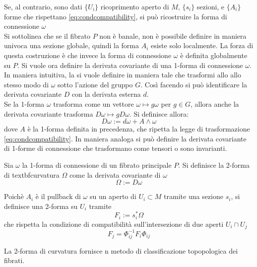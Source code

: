 Se, al contrario, sono dati $\{U_i\}$ ricoprimento aperto di $M$, $\{s_i\}$
sezioni, e $\{A_i\}$ forme che rispettano \ref{eq:condcompatibility}, si può
ricostruire la forma di connessione $\omega$\\
Si sottolinea che se il fibrato $P$ non è banale, non è possibile definire in
maniera univoca una sezione globale, quindi la forma $A_i$ esiste solo localmente.
La forza di questa costruzione è che invece la forma di connessione $\omega$
è definita globalmente su $P$.
Si vuole ora definire la derivata covariante di una
1-forma di connessione $\omega$.
In maniera intuitiva, la si vuole definire in maniera tale che trasformi allo
allo stesso modo di $\omega$ sotto l'azione del gruppo $G$. Così facendo si
può identificare la derivata covariante $D$ con la derivata esterna $d$.\\
Se la 1-forma $\omega$ trasforma come un vettore $\omega \mapsto g\omega$ per
$g \in G$, allora anche la derivata covariante trasforma $ D\omega \mapsto
g D\omega $. Si definisce allora:
   $$ D\omega := d\omega + A \wedge \omega $$
dove $A$ è la 1-forma definita in precedenza, che ripetta la legge di
trasformazione \ref{eq:condcompatibility}. In maniera analoga si può definire la
derivata covariante di 1-forme di connessione che trasformano come tensori o sono
invarianti.
\begin{definition}
   Sia $\omega$ la 1-forma di connessione di un fibrato principale $P$. Si definisce
   la 2-forma di textbf{curvatura} $\Omega$ come la derivata covariante di $\omega$
   $$ \Omega := D\omega $$
\end{definition}
Poichè $A_i$ è il pullback di $\omega$ su un aperto di $U_i \subset M$
tramite una sezione $s_i$, si definisce una 2-forma su $U_i$ tramite
\begin{equation} F_i := s_i^* \Omega \end{equation}
che rispetta la condizione di compatibilità sull'intersezione di due aperti
$U_i \cap U_j$
\begin{equation} F_j = \Phi_{ij}^{-1}F_i\Phi_{ij} \end{equation}

La 2-forma di curvatura fornisce n metodo di classificazione topopologica
dei fibrati.
